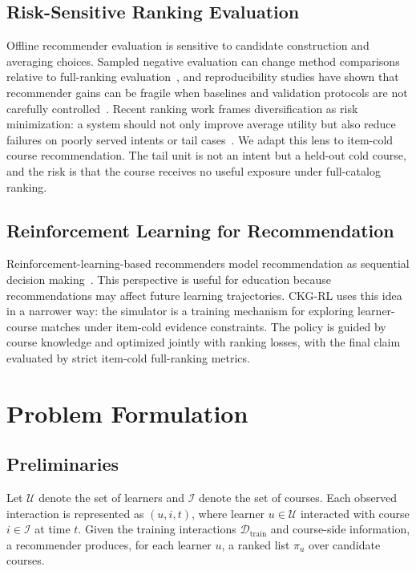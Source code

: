 \documentclass[sigconf,anonymous,review]{acmart}
\begin{document}
\subsection{Risk-Sensitive Ranking Evaluation}
Offline recommender evaluation is sensitive to candidate construction and averaging choices. Sampled negative evaluation can change method comparisons relative to full-ranking evaluation~\cite{krichene2020sampled}, and reproducibility studies have shown that recommender gains can be fragile when baselines and validation protocols are not carefully controlled~\cite{dacrema2019progress}. Recent ranking work frames diversification as risk minimization: a system should not only improve average utility but also reduce failures on poorly served intents or tail cases~\cite{takehi2025diversification}. We adapt this lens to item-cold course recommendation. The tail unit is not an intent but a held-out cold course, and the risk is that the course receives no useful exposure under full-catalog ranking.

\subsection{Reinforcement Learning for Recommendation}
Reinforcement-learning-based recommenders model recommendation as sequential decision making~\cite{shani2005mdp,zhao2018deepreinforcement,chen2023rlrecsurvey}. This perspective is useful for education because recommendations may affect future learning trajectories. CKG-RL uses this idea in a narrower way: the simulator is a training mechanism for exploring learner-course matches under item-cold evidence constraints. The policy is guided by course knowledge and optimized jointly with ranking losses, with the final claim evaluated by strict item-cold full-ranking metrics.

\section{Problem Formulation}

\subsection{Preliminaries}
Let \(\mathcal{U}\) denote the set of learners and \(\mathcal{I}\) denote the set of courses. Each observed interaction is represented as \((u,i,t)\), where learner \(u \in \mathcal{U}\) interacted with course \(i \in \mathcal{I}\) at time \(t\). Given the training interactions \(\mathcal{D}_{\mathrm{train}}\) and course-side information, a recommender produces, for each learner \(u\), a ranked list \(\pi_u\) over candidate courses.
\end{document}
